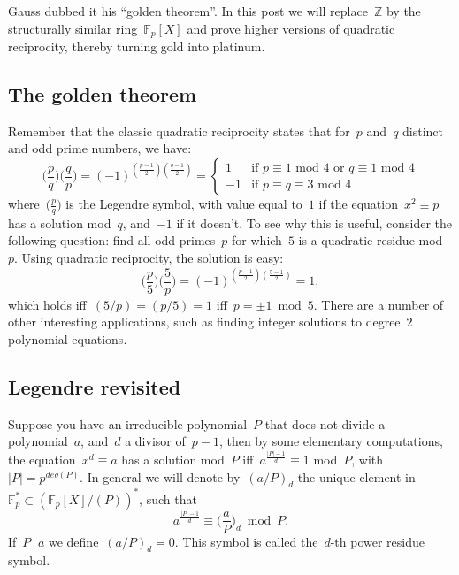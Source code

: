 \label{advanced-alchemy}
Gauss dubbed it his ``golden theorem''. In this post we will replace~${\mathbb{Z}}$ by the structurally similar ring~${\mathbb{F}_{p}[X]}$ and prove higher versions of quadratic reciprocity, thereby turning gold into platinum.

\subsection{The golden theorem}

Remember that the classic quadratic reciprocity states that for~${p}$ and~${q}$ distinct and odd prime numbers, we have:
\begin{equation}
  \bigg( \frac{p}{q} \bigg) \bigg( \frac{q}{p} \bigg)=(-1)^{(\frac{p-1}{2})(\frac{q-1}{2})}= \left\{ \begin{array}{ll} 1 & \textrm{if~$p \equiv 1$ mod~$4$ or~$q \equiv 1$ mod~$4$}\\ -1 & \textrm{if~$p \equiv q \equiv 3$ mod~$4$} \end{array} \right.
\end{equation}
where~$\big( \frac{p}{q} \big)$ is the Legendre symbol, with value equal to~$1$ if the equation~$x^{2} \equiv p$ has a solution mod~$q$, and~$-1$ if it doesn't. To see why this is useful, consider the following question: find all odd primes~$p$ for which~$5$ is a quadratic residue mod~$p$. Using quadratic reciprocity, the solution is easy:
\begin{equation}
  \bigg( \frac{p}{5} \bigg) \bigg( \frac{5}{p} \bigg)=(-1)^{(\frac{p-1}{2})(\frac{5-1}{2})}=1,
\end{equation}
which holds iff~$(5/p)=(p/5)=1$ iff~$p=\pm 1\bmod5$. There are a number of other interesting applications, such as finding integer solutions to degree~$2$ polynomial equations.

\subsection{Legendre revisited}

Suppose you have an irreducible polynomial~${P}$ that does not divide a polynomial~${a}$, and~${d}$ a divisor of~${p-1}$, then by some elementary computations, the equation~${x^{d} \equiv a}$ has a solution mod~${P}$ iff~${a^{\frac{\vert P \vert -1}{d}} \equiv 1}$ mod~${P}$, with~${\vert P \vert = p^{deg(P)}}$. In general we will denote by~${(a/P)_{d}}$ the unique element in~${\mathbb{F}_{p}^{*} \subset (\mathbb{F}_{p}[X]/(P))^{*}}$, such that
\begin{equation}
  a^{\frac{\vert P \vert -1}{d}} \equiv \bigg( \frac{a}{P} \bigg)_{d}\bmod P.
\end{equation}
If~${P\,\vert\, a}$ we define~${(a/P)_{d}=0}$. This symbol is called the~${d}$-th power residue symbol.

